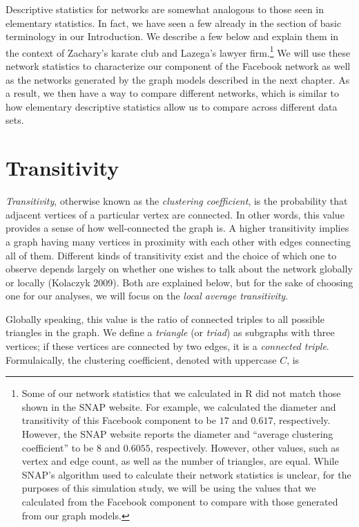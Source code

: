 \documentclass[12pt,twoside]{amherstthesis}
\begin{document}
  Descriptive statistics for networks are somewhat analogous to those seen
  in elementary statistics. In fact, we have seen a few already in the
  section of basic terminology in our Introduction. We describe a few
  below and explain them in the context of Zachary's karate club and
  Lazega's lawyer firm.\footnote{Some of our network statistics that we
    calculated in R did not match those shown in the SNAP website. For
    example, we calculated the diameter and transitivity of this Facebook
    component to be \(17\) and \(0.617\), respectively. However, the SNAP
    website reports the diameter and ``average clustering coefficient'' to
    be \(8\) and \(0.6055\), respectively. However, other values, such as
    vertex and edge count, as well as the number of triangles, are equal.
    While SNAP's algorithm used to calculate their network statistics is
    unclear, for the purposes of this simulation study, we will be using
    the values that we calculated from the Facebook component to compare
    with those generated from our graph models.} We will use these network
  statistics to characterize our component of the Facebook network as well
  as the networks generated by the graph models described in the next
  chapter. As a result, we then have a way to compare different networks,
  which is similar to how elementary descriptive statistics allow us to
  compare across different data sets.
  
  \section{Transitivity}\label{transitivity}
  
  \emph{Transitivity}, otherwise known as the \emph{clustering
  coefficient}, is the probability that adjacent vertices of a particular
  vertex are connected. In other words, this value provides a sense of how
  well-connected the graph is. A higher transitivity implies a graph
  having many vertices in proximity with each other with edges connecting
  all of them. Different kinds of transitivity exist and the choice of
  which one to observe depends largely on whether one wishes to talk about
  the network globally or locally (Kolaczyk 2009). Both are explained
  below, but for the sake of choosing one for our analyses, we will focus
  on the \emph{local average transitivity}.
  
  Globally speaking, this value is the ratio of connected triples to all
  possible triangles in the graph. We define a \emph{triangle} (or
  \emph{triad}) as subgraphs with three vertices; if these vertices are
  connected by two edges, it is a \emph{connected triple}. Formulaically,
  the clustering coefficient, denoted with uppercase \(C\), is
  
\end{document}
